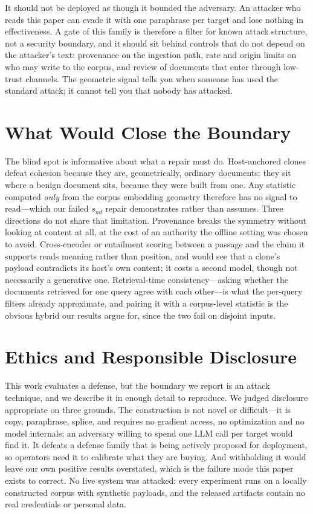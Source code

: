 \documentclass[10pt,journal,compsoc]{IEEEtran}
\begin{document}
It should not be deployed as though it bounded the adversary. An attacker who reads this paper can
evade it with one paraphrase per target and lose nothing in effectiveness. A gate of this family
is therefore a filter for known attack structure, not a security boundary, and it should sit
behind controls that do not depend on the attacker's text: provenance on the ingestion path,
rate and origin limits on who may write to the corpus, and review of documents that enter through
low-trust channels. The geometric signal tells you when someone has used the standard attack; it
cannot tell you that nobody has attacked.

\section{What Would Close the Boundary}
\label{app:future}
The blind spot is informative about what a repair must do. Host-anchored clones defeat cohesion
because they are, geometrically, ordinary documents: they sit where a benign document sits,
because they were built from one. Any statistic computed \emph{only} from the corpus embedding
geometry therefore has no signal to read---which our failed $s_{nd}$ repair demonstrates rather
than assumes. Three directions do not share that limitation. Provenance breaks the symmetry
without looking at content at all, at the cost of an authority the offline setting was chosen to
avoid. Cross-encoder or entailment scoring between a passage and the claim it supports reads
meaning rather than position, and would see that a clone's payload contradicts its host's own
content; it costs a second model, though not necessarily a generative one. Retrieval-time
consistency---asking whether the documents retrieved for one query agree with each other---is
what the per-query filters already approximate, and pairing it with a corpus-level statistic is
the obvious hybrid our results argue for, since the two fail on disjoint inputs.

\section{Ethics and Responsible Disclosure}
\label{app:ethics}
This work evaluates a defense, but the boundary we report is an attack technique, and we describe
it in enough detail to reproduce. We judged disclosure appropriate on three grounds. The
construction is not novel or difficult---it is copy, paraphrase, splice, and requires no gradient
access, no optimization and no model internals; an adversary willing to spend one LLM call per
target would find it. It defeats a defense family that is being actively proposed for deployment,
so operators need it to calibrate what they are buying. And withholding it would leave our own
positive results overstated, which is the failure mode this paper exists to correct. No live
system was attacked: every experiment runs on a locally constructed corpus with synthetic
payloads, and the released artifacts contain no real credentials or personal data.
\end{document}
